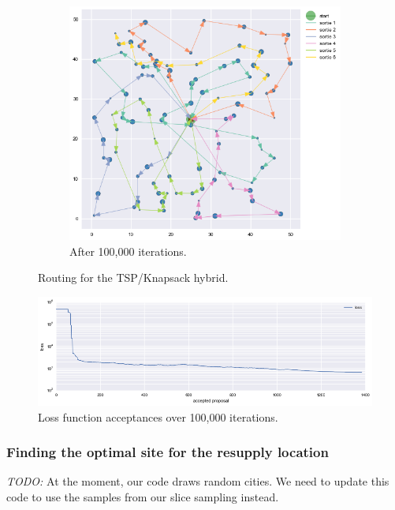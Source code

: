 \documentclass{article} %
\begin{document}
\begin{figure}
\begin{subfigure}[b]{0.5\textwidth}
  \end{subfigure}
  \begin{subfigure}[b]{\textwidth}
    \centering
    \includegraphics[width=\textwidth]{figures/sorties-100000}
    \caption{After 100,000 iterations.}
  \end{subfigure}
  \caption{Routing for the TSP/Knapsack hybrid.}
  \label{fig:sorties}
\end{figure}

\begin{figure}
	\centering
	\includegraphics[width=\textwidth]{figures/sorties-loss}
	\caption{Loss function acceptances over 100,000 iterations.}
	\label{fig:sorties-loss}
\end{figure}

\subsubsection*{Finding the optimal site for the resupply location}

\emph{TODO:} At the moment, our code draws random cities. We need to update this code to use the samples from our slice sampling instead.
\end{document}
